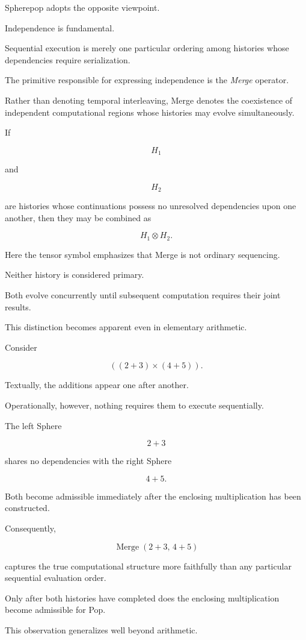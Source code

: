 \documentclass[12pt,oneside]{article}
\theoremstyle{definition}
\theoremstyle{remark}
\begin{document}
Spherepop adopts the opposite viewpoint.

Independence is fundamental.

Sequential execution is merely one particular ordering among histories whose
dependencies require serialization.

The primitive responsible for expressing independence is the
\emph{Merge} operator.

Rather than denoting temporal interleaving, Merge denotes the coexistence of
independent computational regions whose histories may evolve simultaneously.

If

\[
H_1
\]

and

\[
H_2
\]

are histories whose continuations possess no unresolved dependencies upon one
another, then they may be combined as

\[
H_1 \otimes H_2.
\]

Here the tensor symbol emphasizes that Merge is not ordinary sequencing.

Neither history is considered primary.

Both evolve concurrently until subsequent computation requires their joint
results.

This distinction becomes apparent even in elementary arithmetic.

Consider

\[
((2+3)\times(4+5)).
\]

Textually, the additions appear one after another.

Operationally, however, nothing requires them to execute sequentially.

The left Sphere

\[
2+3
\]

shares no dependencies with the right Sphere

\[
4+5.
\]

Both become admissible immediately after the enclosing multiplication has been
constructed.

Consequently,

\[
\operatorname{Merge}
(
2+3,\,
4+5
)
\]

captures the true computational structure more faithfully than any particular
sequential evaluation order.

Only after both histories have completed does the enclosing multiplication
become admissible for Pop.

This observation generalizes well beyond arithmetic.
\end{document}
